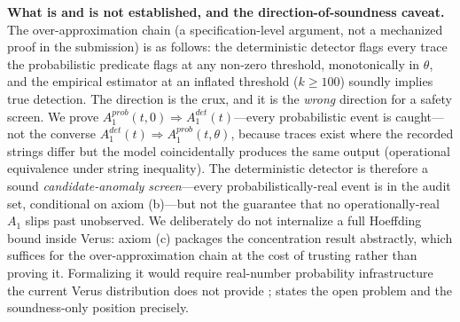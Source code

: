 \documentclass[journal,compsoc,10pt]{IEEEtran}
\providecommand{\citep}{\cite}
\theoremstyle{definition}
\theoremstyle{remark}
\begin{document}
\medskip
\noindent\textbf{What is and is not established, and the
direction-of-soundness caveat.}
The over-approximation chain (a specification-level argument, not a
mechanized proof in the submission) is as follows: the
deterministic detector flags every trace the probabilistic predicate
flags at any non-zero threshold, monotonically in $\theta$, and the
empirical estimator at an inflated threshold ($k \geq 100$) soundly
implies true detection. The direction is the crux, and it is the
\emph{wrong} direction for a safety screen. We prove
$A_1^{\textit{prob}}(t,0) \Rightarrow A_1^{\textit{det}}(t)$---every
probabilistic event is caught---not the converse
$A_1^{\textit{det}}(t) \Rightarrow A_1^{\textit{prob}}(t,\theta)$,
because traces exist where the recorded strings differ but the model
coincidentally produces the same output (operational equivalence under
string inequality). The deterministic detector is therefore a sound
\emph{candidate-anomaly screen}---every probabilistically-real event is
in the audit set, conditional on axiom (b)---but not the guarantee that
no operationally-real $A_1$ slips past unobserved. We deliberately do
not internalize a full Hoeffding bound inside Verus: axiom (c) packages
the concentration result abstractly, which suffices for the
over-approximation chain at the cost of trusting rather than proving
it. Formalizing it would require real-number probability infrastructure
the current Verus distribution does not provide
\citep{HawblitzelEtAl2015IronFleet,Lattuada2023Verus};
 states the open problem and the
soundness-only position precisely.

\end{document}

